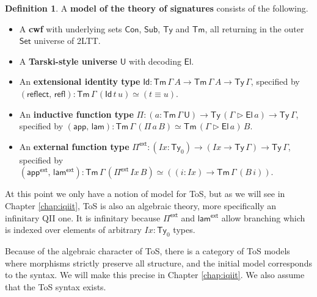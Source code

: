\documentclass[12pt,a4paper,twoside,openany]{book}
\theoremstyle{remark}
\theoremstyle{definition}
\newtheorem{mydefinition}{Definition}
\theoremstyle{theorem}
\newcommand{\mi}[1]{\mathit{#1}}
\newcommand{\ms}[1]{\mathsf{#1}}
\newcommand{\refl}{\mathsf{refl}}
\newcommand{\reflect}{\mathsf{reflect}}
\newcommand{\Con}{\mathsf{Con}}
\newcommand{\Sub}{\mathsf{Sub}}
\newcommand{\Tm}{\mathsf{Tm}}
\newcommand{\Ty}{\mathsf{Ty}}
\newcommand{\U}{\mathsf{U}}
\newcommand{\El}{\mathsf{El}}
\newcommand{\Id}{\mathsf{Id}}
\newcommand{\Set}{\mathsf{Set}}
\newcommand{\ext}{\triangleright}
\newcommand{\Pie}{\Pi^{\mathsf{ext}}}
\newcommand{\appe}{\mathsf{app^{ext}}}
\newcommand{\lame}{\mathsf{lam^{ext}}}
\newcommand{\app}{\ms{app}}
\newcommand{\lam}{\ms{lam}}
\begin{document}
\begin{mydefinition}
\label{def:fqiit-tos}
A \textbf{model of the theory of signatures} consists of the following.
  \begin{itemize}
    \item A \textbf{cwf} with underlying sets $\Con$, $\Sub$, $\Ty$ and $\Tm$, all returning in
      the outer $\Set$ universe of 2LTT.
    \item A \textbf{Tarski-style universe} $\U$ with decoding $\El$.
    \item An \textbf{extensional identity type} $\Id : \Tm\,\Gamma\,A \to
      \Tm\,\Gamma\,A \to \Ty\,\Gamma$, specified by $(\reflect,\,\refl) :
      \Tm\,\Gamma\,(\Id\,t\,u) \simeq (t \equiv u)$.
    \item An \textbf{inductive function type} $\Pi : (a : \Tm\,\Gamma\,\U) \to
      \Ty\,(\Gamma\ext\El\,a) \to \Ty\,\Gamma$, specified by
      $(\app,\,\lam) : \Tm\,\Gamma\,(\Pi\,a\,B) \simeq \Tm\,(\Gamma \ext \El\,a)\,B$.
    \item An \textbf{external function type} $\Pie : (\mi{Ix} : \Ty_0) \to (\mi{Ix} \to \Ty\,\Gamma) \to \Ty\,\Gamma$, specified by
      $(\appe,\,\lame) : \Tm\,\Gamma\,(\Pie\,\mi{Ix}\,B) \simeq ((i : \mi{Ix}) \to \Tm\,\Gamma\,(B\,i))$.
  \end{itemize}
\end{mydefinition}
At this point we only have a notion of model for ToS, but as we will see in
Chapter \ref{chap:iqiit}, ToS is also an algebraic theory, more specifically an
infinitary QII one. It is infinitary because $\Pie$ and $\lame$ allow branching
which is indexed over elements of arbitrary $\mi{Ix} : \Ty_0$ types.

Because of the algebraic character of ToS, there is a category of ToS models
where morphisms strictly preserve all structure, and the initial model
corresponds to the syntax. We will make this precise in Chapter
\ref{chap:iqiit}. We also assume that the ToS syntax exists.
\end{document}
